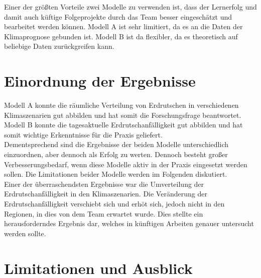 \documentclass[../main.tex]{subfiles}
\begin{document}
Einer der größten Vorteile zwei Modelle zu verwenden ist, dass der Lernerfolg und damit auch küftige Folgeprojekte durch das Team besser eingeschätzt und bearbeitet werden können.
Modell A ist sehr limitiert, da es an die Daten der Klimaprognose gebunden ist.
Modell B ist da flexibler, da es theoretisch auf beliebige Daten zurückgreifen kann.


\section{Einordnung der Ergebnisse}
Modell A konnte die räumliche Verteilung von Erdrutschen in verschiedenen Klimaszenarien gut abbilden und hat somit die Forschungsfrage beantwortet.
Modell B konnte die tagesaktuelle Erdrutschanfälligkeit gut abbilden und hat somit wichtige Erkenntnisse für die Praxis geliefert. \\
Dementsprechend sind die Ergebnisse der beiden Modelle unterschiedlich einzuordnen, aber dennoch als Erfolg zu werten.
Dennoch besteht großer Verbesserungsbedarf, wenn diese Modelle aktiv in der Praxis eingesetzt werden sollen.
Die Limitationen beider Modelle werden im Folgenden diskutiert. \\

Einer der überraschendsten Ergebnisse war die Umverteilung der Erdrutschanfälligkeit in den Klimaszenarien.
Die Veränderung der Erdrutschanfälligkeit verschiebt sich und erhöt sich, jedoch nicht in den Regionen, in dies von dem Team erwartet wurde.
Dies stellte ein herausforderndes Ergebnis dar, welches in künftigen Arbeiten genauer untersucht werden sollte.


\section{Limitationen und Ausblick}
\end{document}
